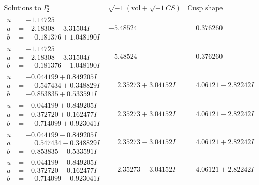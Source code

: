 \documentclass[1p]{elsarticle_modified}
\theoremstyle{definition}
\newcommand{\I}{\sqrt{-1}}
\begin{document}
$$\begin{array}{c|c|c}  
\text{Solutions to }I^u_{2}& \I (\text{vol} + \sqrt{-1}CS) & \text{Cusp shape}\\
 \hline 
\begin{aligned}
u &= -1.14725\phantom{ +0.000000I} \\
a &= -2.18308 + 3.31504 I \\
b &= \phantom{-}0.181376 + 1.048190 I\end{aligned}
 & -5.48524\phantom{ +0.000000I} & \phantom{-}0.376260\phantom{ +0.000000I} \\ \hline\begin{aligned}
u &= -1.14725\phantom{ +0.000000I} \\
a &= -2.18308 - 3.31504 I \\
b &= \phantom{-}0.181376 - 1.048190 I\end{aligned}
 & -5.48524\phantom{ +0.000000I} & \phantom{-}0.376260\phantom{ +0.000000I} \\ \hline\begin{aligned}
u &= -0.044199 + 0.849205 I \\
a &= \phantom{-}0.547434 + 0.348829 I \\
b &= -0.853835 + 0.533591 I\end{aligned}
 & \phantom{-}2.35273 + 3.04152 I & \phantom{-}4.06121 - 2.82242 I \\ \hline\begin{aligned}
u &= -0.044199 + 0.849205 I \\
a &= -0.372720 + 0.162477 I \\
b &= \phantom{-}0.714099 + 0.923041 I\end{aligned}
 & \phantom{-}2.35273 + 3.04152 I & \phantom{-}4.06121 - 2.82242 I \\ \hline\begin{aligned}
u &= -0.044199 - 0.849205 I \\
a &= \phantom{-}0.547434 - 0.348829 I \\
b &= -0.853835 - 0.533591 I\end{aligned}
 & \phantom{-}2.35273 - 3.04152 I & \phantom{-}4.06121 + 2.82242 I \\ \hline\begin{aligned}
u &= -0.044199 - 0.849205 I \\
a &= -0.372720 - 0.162477 I \\
b &= \phantom{-}0.714099 - 0.923041 I\end{aligned}
 & \phantom{-}2.35273 - 3.04152 I & \phantom{-}4.06121 + 2.82242 I \\ \hline\begin{aligned}

\end{aligned}
\end{array}$$
\end{document}
